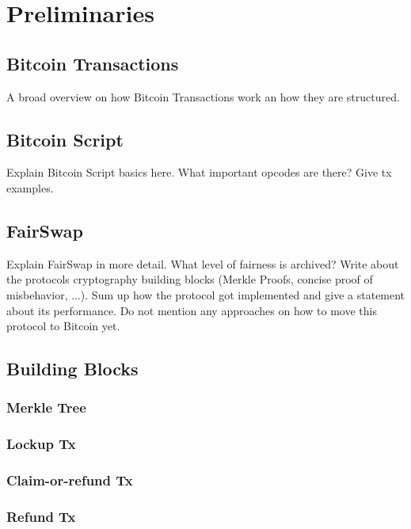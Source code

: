 \documentclass{cacthesis}
\begin{document}
    \chapter{Preliminaries}
        \section{Bitcoin Transactions}
        A broad overview on how Bitcoin Transactions work an how they are structured.
        
        \section{Bitcoin Script}
        Explain Bitcoin Script basics here. What important opcodes are there? Give tx examples.
        
        \section{FairSwap}
        Explain FairSwap in more detail. What level of fairness is archived? Write about the protocols cryptography building blocks (Merkle Proofs, concise proof of misbehavior, ...). Sum up how the protocol got implemented and give a statement about its performance. Do not mention any approaches on how to move this protocol to Bitcoin yet.
        
        \section{Building Blocks}
        \subsection{Merkle Tree}
        \subsection{Lockup Tx}
        \subsection{Claim-or-refund Tx}
        \subsection{Refund Tx}
\end{document}
